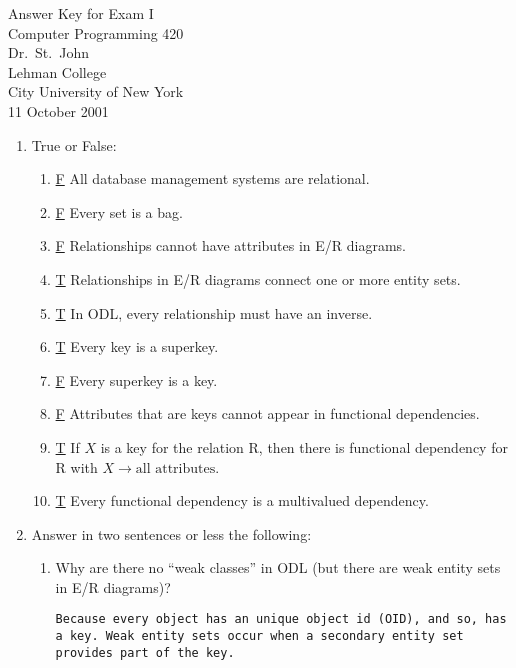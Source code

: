 \documentclass[12pt]{article}
\begin{document}
{\large
\begin{center}
    Answer Key for Exam I\\
    Computer Programming 420 \\
    Dr.~St.~John\\ 
    Lehman College\\
    City University of New York\\ 
    11 October 2001
\end{center}
}


\begin{enumerate}

    \item True or False: 
    \begin{enumerate}
        \item \underline{F} All database management systems
		are relational.
        \item \underline{F} Every set is a bag.
        \item \underline{F} Relationships cannot have attributes
		in E/R diagrams. 
        \item \underline{T} Relationships in E/R diagrams 
		connect one or more entity sets.
        \item \underline{T} In ODL, every relationship must
		have an inverse.
        \item \underline{T} Every key is a superkey.
        \item \underline{F} Every superkey is a key.
        \item \underline{F} Attributes that are keys cannot 
		appear in functional dependencies.
        \item \underline{T} If $X$ is a key for the relation			
		R, then there is functional dependency for R with 
		$X \rightarrow \mbox{all attributes}$.
        \item \underline{T} Every functional dependency is
		a multivalued dependency.
    \end{enumerate}

\item Answer in two sentences or less the following:
\begin{enumerate}
    \item Why are there no ``weak classes'' in ODL (but there are weak
	entity sets in E/R diagrams)?

	{\tt Because every object has an unique object id (OID), and
	so, has a key.  Weak entity sets occur when a secondary 
	entity set provides part of the key.}


\end{enumerate}
\end{enumerate}
\end{document}
